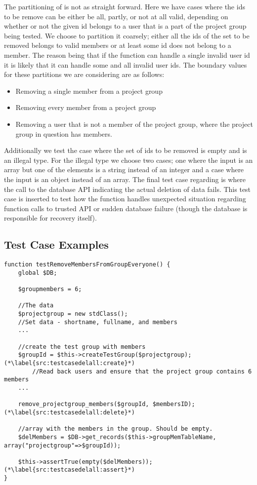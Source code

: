 The partitioning of \varuserids{} is not as straight forward.
Here we have cases where the ids to be remove can be either be all, partly, or not at all valid, depending on whether or not the given id belongs to a user that is a part of the project group being tested.
We choose to partition it coarsely; either all the ids of the set to be removed belongs to valid members or at least some id does not belong to a member.
The reason being that if the function can handle a single invalid user id it is likely that it can handle some and all invalid user ids.
The boundary values for these partitions we are considering are as follows: 
\begin{itemize}
	\item Removing a single member from a project group
	\item Removing every member from a project group
	\item Removing a user that is not a member of the project group, where the project group in question has members.
\end{itemize}
Additionally we test the case where the set of ids to be removed is empty and is an illegal type.
For the illegal type we choose two cases; one where the input is an array but one of the elements is a string instead of an integer and a case where the input is an object instead of an array.
The final test case regarding \varuserids{} is where the call to the database API indicating the actual deletion of data fails.
This test case is inserted to test how the function handles unexpected situation regarding function calls to trusted API or sudden database failure (though the database is responsible for recovery itself).

\subsection{Test Case Examples}
\label{sub:testCaseEg}
\begin{lstlisting}[style=phpCode, caption=\myCaption{A test case for the function remove\_projectgroup\_members. The test case tests if the function correctly removes all the members of the project group when instructed to.}, label=src:testcasedelall]
function testRemoveMembersFromGroupEveryone() {
	global $DB;
	
	$groupmembers = 6;
	
	//The data
	$projectgroup = new stdClass(); 
	//Set data - shortname, fullname, and members
	...
	
	//create the test group with members
	$groupId = $this->createTestGroup($projectgroup); (*\label{src:testcasedelall:create}*)
		//Read back users and ensure that the project group contains 6 members
	...
	
	remove_projectgroup_members($groupId, $membersID); (*\label{src:testcasedelall:delete}*)
	
	//array with the members in the group. Should be empty.
	$delMembers = $DB->get_records($this->groupMemTableName, array("projectgroup"=>$groupId));
	
	$this->assertTrue(empty($delMembers)); (*\label{src:testcasedelall:assert}*)
}
\end{lstlisting}

